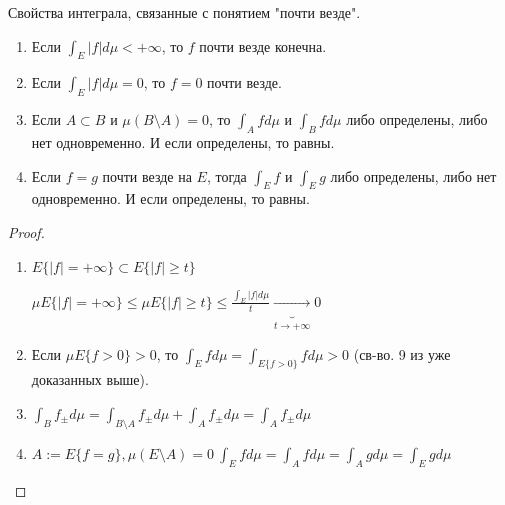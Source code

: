 \begin{properties}
    Свойства интеграла, связанные с понятием "почти везде".

    \begin{enumerate}
        \item Если $\int_{E}{|f| d \mu} < + \infty$, то $f$ почти везде конечна.
        \item Если $\int_E{|f| d \mu = 0}$, то $f = 0$ почти везде.
        \item Если $A \subset B$ и $\mu (B \setminus A) = 0$, то $\int_A{f d \mu}$ и $\int_B{f d \mu}$ либо определены, либо нет одновременно. И если определены, то равны.
        \item Если $f = g$ почти везде на $E$, тогда $\int_E{f}$ и $\int_E{g}$ либо определены, либо нет одновременно. И если определены, то равны.
    \end{enumerate}
\end{properties}

\begin{proof}
    \begin{enumerate}
        \item {
            $E\{ |f| = +\infty \} \subset E\{ |f| \geq t \}$

            $\mu E \{ |f| = +\infty \} \leq \mu E \{ |f| \geq t \} \leq \frac{\int_E{|f| d \mu}}{t} \underbrace{\rightarrow}_{t \rightarrow +\infty} 0$
        }
        \item {
            Если $\mu E \{ f > 0 \} > 0$, то $\int_E{f d \mu} = \int_{E\{ f > 0 \}}{f d \mu} > 0$ (св-во. 9 из уже доказанных выше).
        }
        \item {
            $\int_B{f_{\pm} d \mu} = \int_{B \setminus A}{f_{\pm} d \mu} + \int_{A}{f_{\pm} d \mu} = \int_A{f_{\pm} d \mu}$
        }
        \item {
            $A := E\{ f = g \}, \mu (E \setminus A) = 0 \ \int_{E}{f d \mu} = \int_{A}{f d \mu} = \int_{A}{g d \mu} = \int_E{g d \mu}$
        }
    \end{enumerate}
\end{proof}


